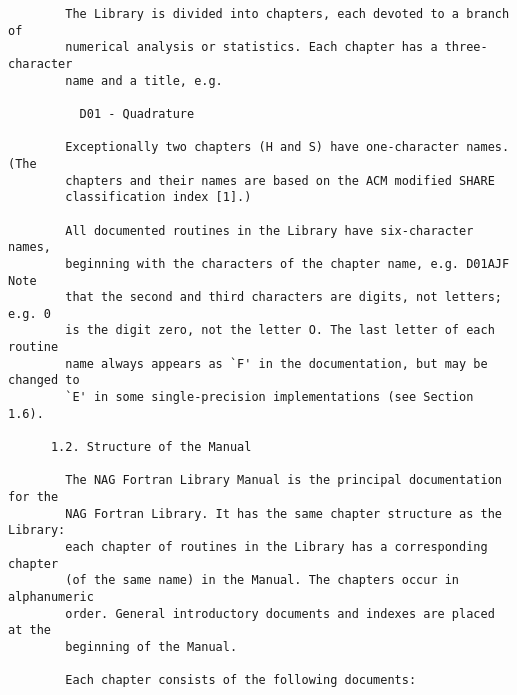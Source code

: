 \begin{small}
\begin{verbatim}
        The Library is divided into chapters, each devoted to a branch of         
        numerical analysis or statistics. Each chapter has a three-character      
        name and a title, e.g.                                                    
                                                                                  
          D01 - Quadrature                                                        
                                                                                  
        Exceptionally two chapters (H and S) have one-character names. (The       
        chapters and their names are based on the ACM modified SHARE              
        classification index [1].)                                                
                                                                                  
        All documented routines in the Library have six-character names,          
        beginning with the characters of the chapter name, e.g. D01AJF Note       
        that the second and third characters are digits, not letters; e.g. 0      
        is the digit zero, not the letter O. The last letter of each routine      
        name always appears as `F' in the documentation, but may be changed to    
        `E' in some single-precision implementations (see Section 1.6).           
                                                                                  
      1.2. Structure of the Manual                                                
                                                                                  
        The NAG Fortran Library Manual is the principal documentation for the     
        NAG Fortran Library. It has the same chapter structure as the Library:    
        each chapter of routines in the Library has a corresponding chapter       
        (of the same name) in the Manual. The chapters occur in alphanumeric      
        order. General introductory documents and indexes are placed at the       
        beginning of the Manual.                                                  
                                                                                  
        Each chapter consists of the following documents:                         
                                                                                  

\end{verbatim}
\end{small}
